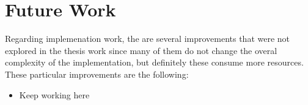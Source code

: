 \chapter{Future Work}

Regarding implemenation work, the are several improvements that were not explored 
in the thesis work since many of them do not change the overal complexity 
of the implementation, but definitely these consume more resources.
These particular improvements are the following:

\begin{itemize}
    \item Keep working here

\end{itemize}

